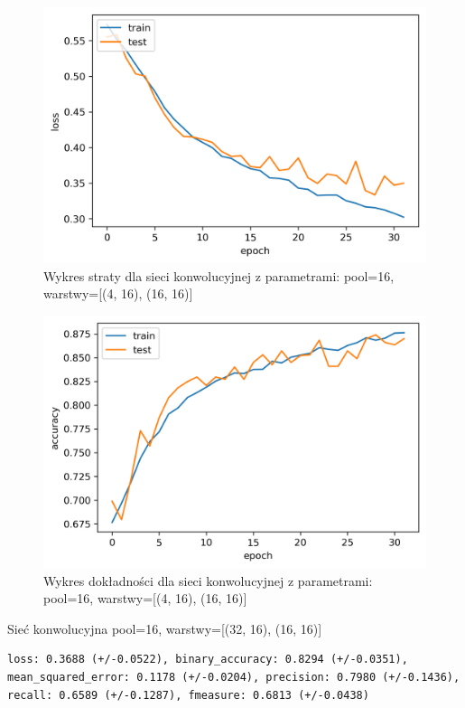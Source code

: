 \documentclass[polish,12pt]{aghthesis}
\begin{document}
\begin{figure}[H]
	\centering
	\captionsetup{justification=centering}
	\includegraphics[width=0.7\linewidth]{conv_16_4_loss.png}
	\caption{Wykres straty dla sieci konwolucyjnej z parametrami: pool=16, warstwy=[(4, 16), (16, 16)]}
	\label{fig:conv_16_4_loss}
\end{figure}
\begin{figure}[H]
	\centering
	\captionsetup{justification=centering}
	\includegraphics[width=0.7\linewidth]{conv_16_4_acc.png}
	\caption{Wykres dokładności dla sieci konwolucyjnej z parametrami: pool=16, warstwy=[(4, 16), (16, 16)]}
	\label{fig:conv_16_4_acc}
\end{figure}

Sieć konwolucyjna pool=16, warstwy=[(32, 16), (16, 16)]

\begin{lstlisting}[float=h!, style=result, caption={Wyniki sieci konwolucyjnej}]
loss: 0.3688 (+/-0.0522), binary_accuracy: 0.8294 (+/-0.0351), mean_squared_error: 0.1178 (+/-0.0204), precision: 0.7980 (+/-0.1436), recall: 0.6589 (+/-0.1287), fmeasure: 0.6813 (+/-0.0438)
\end{lstlisting}
\end{document}
